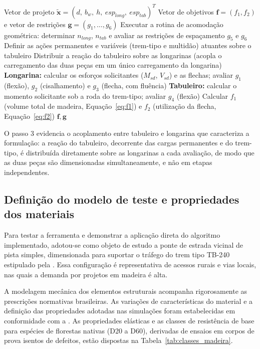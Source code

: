 \begin{algorithm}[!ht]
\caption{AvaliarModelo($\tilde{\mathbf{x}}$)}
\label{alg:avaliarmodelo}
\begin{algorithmic}[1]
\Require Vetor de projeto $\tilde{\mathbf{x}} = (d,\ b_w,\ h,\ esp_{long},\ esp_{tab})^T$
\Ensure Vetor de objetivos $\mathbf{f} = (f_1, f_2)$ e vetor de restrições $\mathbf{g} = (g_1,\ldots,g_6)$
\State Executar a rotina de acomodação geométrica: determinar $n_{long}$, $n_{tab}$ e avaliar as restrições de espaçamento $g_5$ e $g_6$
\State Definir as ações permanentes e variáveis (trem-tipo e multidão) atuantes sobre o tabuleiro
\State Distribuir a reação do tabuleiro sobre as longarinas (acopla o carregamento das duas peças em um único carregamento da longarina)
\State \textbf{Longarina:} calcular os esforços solicitantes ($M_{sd}$, $V_{sd}$) e as flechas; avaliar $g_1$ (flexão), $g_2$ (cisalhamento) e $g_3$ (flecha, com fluência)
\State \textbf{Tabuleiro:} calcular o momento solicitante sob a roda do trem-tipo; avaliar $g_4$ (flexão)
\State Calcular $f_1$ (volume total de madeira, Equação~\eqref{eq:f1}) e $f_2$ (utilização da flecha, Equação~\eqref{eq:f2})
\State \Return $\mathbf{f}, \mathbf{g}$
\end{algorithmic}
\end{algorithm}

O passo 3 evidencia o acoplamento entre tabuleiro e longarina que caracteriza a formulação: a reação do tabuleiro, decorrente das cargas permanentes e do trem-tipo, é distribuída diretamente sobre as longarinas a cada avaliação, de modo que as duas peças são dimensionadas simultaneamente, e não em etapas independentes.

\subsection{Definição do modelo de teste e propriedades dos materiais}\label{sec:modelo_teste}

Para testar a ferramenta e demonstrar a aplicação direta do algoritmo implementado, adotou-se como objeto de estudo a ponte de estrada vicinal de pista simples, dimensionada para suportar o tráfego do trem tipo TB-240 estipulado pela \textcite{nbr7188}.
Essa configuração é representativa de acessos rurais e vias locais, nas quais a demanda por projetos em madeira é alta.

A modelagem mecânica dos elementos estruturais acompanha rigorosamente as prescrições normativas brasileiras.
As variações de características do material e a definição das propriedades adotadas nas simulações foram estabelecidas em conformidade com a \textcite{NBR7190-1:2022}.
As propriedades elásticas e as classes de resistência de base para espécies de florestas nativas (D20 a D60), derivadas de ensaios em corpos de prova isentos de defeitos, estão dispostas na Tabela~\ref{tab:classes_madeira}.

